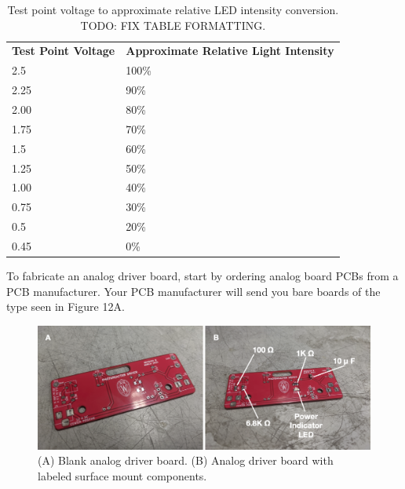 \documentclass[11pt]{article}
\begin{document}
\begin{table}[H]
	\centering
	\begin{tabular}{ll}
		\centering
		\textbf{Test Point Voltage} & \textbf{Approximate Relative Light Intensity} \\
		2.5                         & 100\%                                         \\
		2.25                        & 90\%                                          \\
		2.00                        & 80\%                                          \\
		1.75                        & 70\%                                          \\
		1.5                         & 60\%                                          \\
		1.25                        & 50\%                                          \\
		1.00                        & 40\%                                          \\
		0.75                        & 30\%                                          \\
		0.5                         & 20\%                                          \\
		0.45                        & 0\%                                          
	\end{tabular}
	\caption{Test point voltage to approximate relative LED intensity conversion. TODO: FIX TABLE FORMATTING.}
	\label{tab:analog-board-conversion}
\end{table}

To fabricate an analog driver board, start by ordering analog board PCBs from a PCB manufacturer. Your PCB manufacturer will send you bare boards of the type seen in Figure 12A. 

\begin{figure}[H]
	\centering
	\includegraphics[width=\textwidth]{"./fig12.png"}
	\caption{(A) Blank analog driver board. (B) Analog driver board with labeled surface mount components.}
\end{figure}
\end{document}
